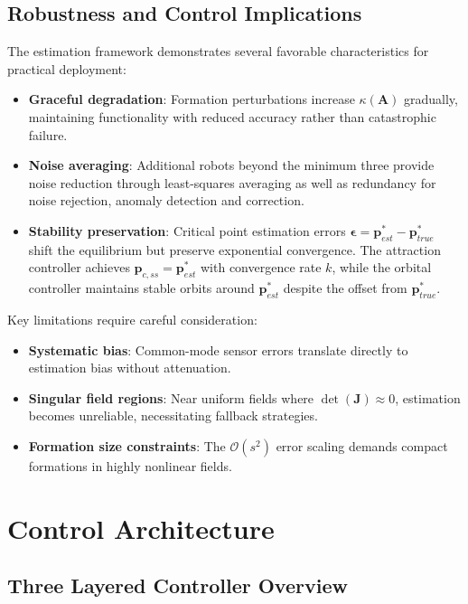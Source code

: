 \documentclass[lettersize,journal]{IEEEtran}
\begin{document}
\subsection{Robustness and Control Implications}

The estimation framework demonstrates several favorable characteristics for practical deployment:

\begin{itemize}
\item \textbf{Graceful degradation}: Formation perturbations increase $\kappa(\mathbf{A})$ gradually, maintaining functionality with reduced accuracy rather than catastrophic failure.
\item \textbf{Noise averaging}: Additional robots beyond the minimum three provide noise reduction through least-squares averaging as well as redundancy for noise rejection, anomaly detection and correction.
\item \textbf{Stability preservation}: Critical point estimation errors $\boldsymbol{\epsilon} = \mathbf{p}^*_{est} - \mathbf{p}^*_{true}$ shift the equilibrium but preserve exponential convergence. The attraction controller achieves $\mathbf{p}_{c,ss} = \mathbf{p}^*_{est}$ with convergence rate $k$, while the orbital controller maintains stable orbits around $\mathbf{p}^*_{est}$ despite the offset from $\mathbf{p}^*_{true}$.
\end{itemize}

Key limitations require careful consideration:

\begin{itemize}
\item \textbf{Systematic bias}: Common-mode sensor errors translate directly to estimation bias without attenuation.
\item \textbf{Singular field regions}: Near uniform fields where $\det(\mathbf{J}) \approx 0$, estimation becomes unreliable, necessitating fallback strategies.
\item \textbf{Formation size constraints}: The $\mathcal{O}(s^2)$ error scaling demands compact formations in highly nonlinear fields.
\end{itemize}

\section{Control Architecture}

\subsection{Three Layered Controller Overview}
\end{document}
